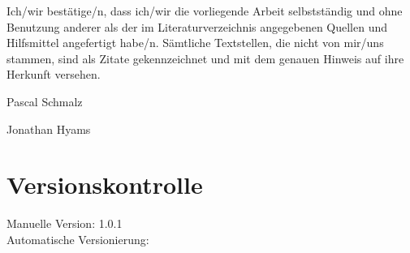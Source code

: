 \documentclass[11pt,titelpage]{scrartcl}
\begin{document}
Ich/wir bestätige/n, dass ich/wir die vorliegende Arbeit selbstständig und ohne Benutzung anderer als der im Literaturverzeichnis angegebenen Quellen und Hilfsmittel angefertigt habe/n. Sämtliche Textstellen, die nicht von mir/uns stammen, sind als Zitate gekennzeichnet und mit dem genauen Hinweis auf ihre Herkunft versehen.

\vspace*{10mm}

Pascal Schmalz

\vspace*{15mm}



Jonathan Hyams










\section{Versionskontrolle}
Manuelle Version: 1.0.1
\\

\noindent
Automatische Versionierung:
\immediate{}

\immediate{}
\end{document}

